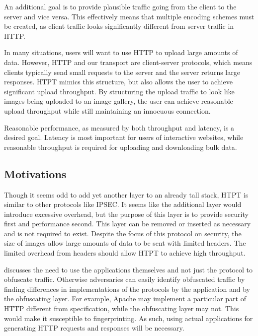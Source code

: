 An additional goal is to provide plausible traffic going from the client to the server and vice versa. This effectively means that multiple encoding schemes must be created, as client traffic looks significantly different from server traffic in HTTP. 

In many situations, users will want to use HTTP to upload large amounts of data. However, HTTP and our transport are client-server protocols, which means clients typically send small requests to the server and the server returns large responses. HTPT mimics this structure, but also allows the user to achieve significant upload throughput. By structuring the upload traffic to look like images being uploaded to an image gallery, the user can achieve reasonable upload throughput while still maintaining an innocuous connection.


Reasonable performance, as measured by both throughput and latency, is a desired goal. Latency is most important for users of interactive websites, while reasonable throughput is required for uploading and downloading bulk data. 

\subsection{Motivations}
Though it seems odd to add yet another layer to an already tall stack, HTPT is similar to other protocols like IPSEC. It seems like the additional layer would introduce excessive overhead, but the purpose of this layer is to provide security first and performance second. This layer can be removed or inserted as necessary and is not required to exist. Despite the focus of this protocol on security, the size of images allow large amounts of data to be sent with limited headers. The limited overhead from headers should allow HTPT to achieve high throughput.

\cite{Ref2} discusses the need to use the applications themselves and not just the protocol to obfuscate traffic. Otherwise adversaries can easily identify obfuscated traffic by finding differences in implementations of the protocols by the application and by the obfuscating layer. For example, Apache may implement a particular part of HTTP different from specification, while the obfuscating layer may not. This would make it susceptible to fingerprinting. As such, using actual applications for generating HTTP requests and responses will be necessary.

